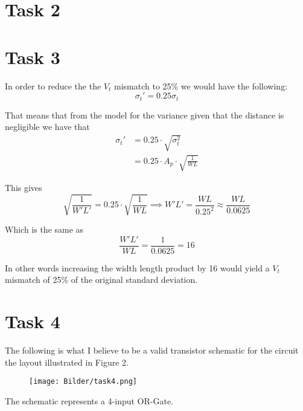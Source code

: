 \documentclass[a4paper,11pt,norsk]{article}
\begin{document}
\section*{Task 2}

\section*{Task 3}
In order to reduce the the $V_t$ mismatch to 25\% we would have the following:
\[
    \sigma_{t}' = 0.25 \sigma_t
\]

That means that from the model for the variance given that the distance is negligible we have that
\begin{align*}
    \sigma_{t}' &= 0.25 \cdot \sqrt{\sigma_t^2} \\
                &= 0.25 \cdot A_p \cdot \sqrt{\frac{1}{WL}}
\end{align*}

This gives 
\[
    \sqrt{\frac{1}{W' L'}} = 0.25 \cdot \sqrt{\frac{1}{WL}} \implies W'L' = \frac{WL}{0.25^2} \approx \frac{WL}{0.0625}
\]

Which is the same as
\[
    \frac{W'L'}{WL} = \frac{1}{0.0625} = 16
\]

In other words increasing the width length product by 16 would yield a $V_t$ mismatch of 25\% of the original standard deviation.

\section*{Task 4}
The following is what I believe to be a valid transistor schematic for the circuit
the layout illustrated in Figure 2.
\begin{figure}[H]
    \centering
    \texttt{[image: Bilder/task4.png]}
\end{figure}
The schematic represents a 4-input OR-Gate.
\end{document}

